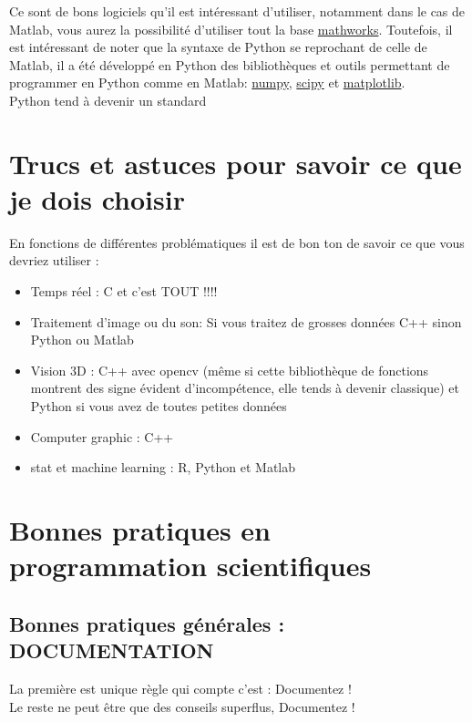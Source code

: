 Ce sont de bons logiciels qu'il est intéressant d'utiliser, notamment dans le cas de Matlab, 
vous aurez la possibilité d'utiliser tout la base \href{http://www.mathworks.fr/matlabcentral/fileexchange}{mathworks}.
Toutefois, il est intéressant de noter que la syntaxe de Python se reprochant de celle de Matlab, il a 
été développé en Python des bibliothèques et outils permettant de programmer en Python comme en Matlab: 
\href{http://www.numpy.org/}{numpy}, \href{http://www.scipy.org/}{scipy} et \href{http://matplotlib.org/}{matplotlib}.\\

Python tend à devenir un standard 


\section{Trucs et astuces pour savoir ce que je dois choisir}

En fonctions de différentes problématiques il est de bon ton de savoir ce que vous devriez utiliser :

\begin{itemize}
\item Temps réel : C et c'est TOUT !!!!
\item Traitement d'image ou du son: Si vous traitez de grosses données C++ sinon Python ou Matlab
\item Vision 3D : C++ avec opencv (même si cette bibliothèque de fonctions montrent des signe 
évident d'incompétence, elle tends à devenir classique) et Python si vous avez de toutes petites données
\item Computer graphic : C++ 
\item stat et machine learning : R, Python et Matlab
\end{itemize}  

\section{Bonnes pratiques en programmation scientifiques}

\subsection{Bonnes pratiques générales : DOCUMENTATION}

La première est unique règle qui compte c'est : Documentez ! \\

Le reste ne peut être que des conseils superflus, Documentez ! \\

